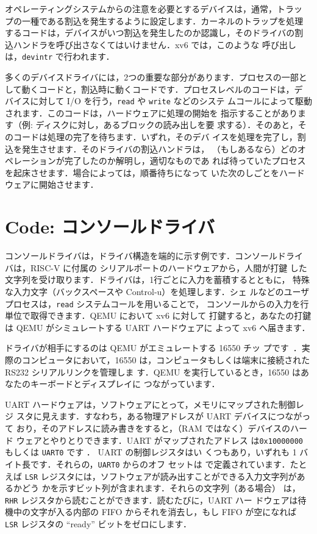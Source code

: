 オペレーティングシステムからの注意を必要とするデバイスは，通常，トラッ
プの一種である割込を発生するように設定します．カーネルのトラップを処理
するコードは，デバイスがいつ割込を発生したのか認識し，そのドライバの割
込ハンドラを呼び出さなくてはいけません．xv6 では，このような
呼び出しは，\texttt{devintr} 
で行われます．

多くのデバイスドライバには，2つの重要な部分があります．プロセスの一部と
して動くコードと，割込時に動くコードです．プロセスレベルのコードは，デ
バイスに対して I/O を行う，\texttt{read} や \texttt{write} などのシステ
ムコールによって駆動されます．このコードは，ハードウェアに処理の開始を
指示することがあります（例: ディスクに対し，あるブロックの読み出しを要
求する）．そのあと，そのコードは処理の完了を待ちます．いずれ，そのデバ
イスを処理を完了し，割込を発生させます．そのドライバの割込ハンドラは，
（もしあるなら）どのオペレーションが完了したのか解明し，適切なものであ
れば待っていたプロセスを起床させます．場合によっては，順番待ちになって
いた次のしごとをハードウェアに開始させます．

\section{Code: コンソールドライバ}

コンソールドライバは，ドライバ構造を端的に示す例です．コンソールドライ
バは，RISC-V に付属の  シリアルポートのハードウェアから，人間が打鍵
した文字列を受け取ります．ドライバは，1行ごとに入力を蓄積するとともに，
特殊な入力文字（バックスペースや Control-u）を処理します．シェ
ルなどのユーザプロセスは，\texttt{read} システムコールを用いることで，
コンソールからの入力を行単位で取得できます．QEMU において xv6 に対して
打鍵すると，あなたの打鍵は QEMU がシミュレートする UART ハードウェアに
よって xv6 へ届きます．

ドライバが相手にするのは QEMU がエミュレートする 16550 チッ
プです~\cite{ns16550a}．実際のコンピュータにおいて，16550
は，コンピュータもしくは端末に接続された RS232 シリアルリンクを管理しま
す．QEMU を実行しているとき，16550 はあなたのキーボードとディスプレイに
つながっています．

UART ハードウェアは，ソフトウェアにとって，メモリにマップされた制御レジ
スタに見えます．すなわち，ある物理アドレスが UART デバイスにつながって
おり，そのアドレスに読み書きをすると，（RAM ではなく）デバイスのハード
ウェアとやりとりできます．UART がマップされたアドレス
は\texttt{0x10000000} もしくは \texttt{UART0} です
．
UART の制御レジスタはい
くつもあり，いずれも 1 バイト長です．それらの，\texttt{UART0} からのオフ
セットは  で定義されています．たとえば \texttt{LSR}
レジスタには，ソフトウェアが読み出すことができる入力文字列があるかどう
かを示すビット列が含まれます．それらの文字列（ある場合）
は，\texttt{RHR} レジスタから読むことができます．読むたびに，UART ハー
ドウェアは待機中の文字が入る内部の FIFO からそれを消去し，もし FIFO
が空になれば \texttt{LSR} レジスタの ``ready'' ビットをゼロにします．

